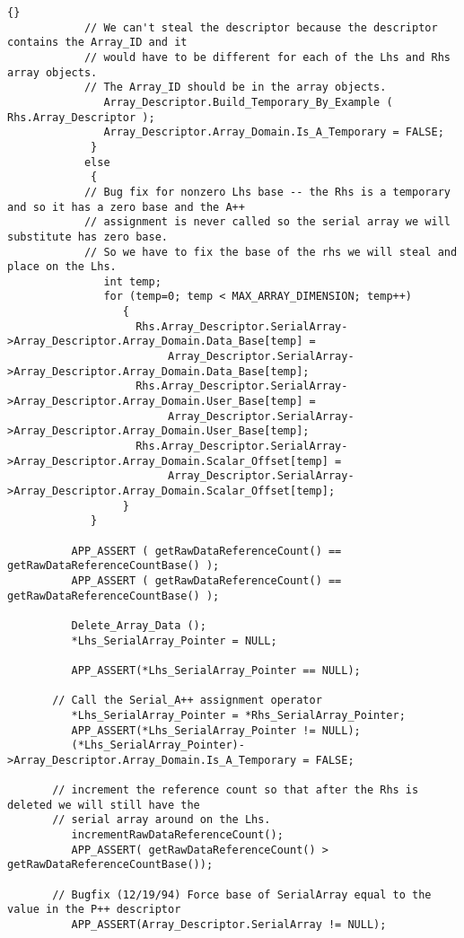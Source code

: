 \documentclass[10pt]{llncs}
\begin{document}
\begin{lstlisting}{}
            // We can't steal the descriptor because the descriptor contains the Array_ID and it
            // would have to be different for each of the Lhs and Rhs array objects.
            // The Array_ID should be in the array objects.
               Array_Descriptor.Build_Temporary_By_Example ( Rhs.Array_Descriptor ); 
               Array_Descriptor.Array_Domain.Is_A_Temporary = FALSE;
             }
            else
             {
            // Bug fix for nonzero Lhs base -- the Rhs is a temporary and so it has a zero base and the A++
            // assignment is never called so the serial array we will substitute has zero base.  
            // So we have to fix the base of the rhs we will steal and place on the Lhs.
               int temp;
               for (temp=0; temp < MAX_ARRAY_DIMENSION; temp++)
                  {
                    Rhs.Array_Descriptor.SerialArray->Array_Descriptor.Array_Domain.Data_Base[temp] = 
                         Array_Descriptor.SerialArray->Array_Descriptor.Array_Domain.Data_Base[temp];
                    Rhs.Array_Descriptor.SerialArray->Array_Descriptor.Array_Domain.User_Base[temp] = 
                         Array_Descriptor.SerialArray->Array_Descriptor.Array_Domain.User_Base[temp];
                    Rhs.Array_Descriptor.SerialArray->Array_Descriptor.Array_Domain.Scalar_Offset[temp] = 
                         Array_Descriptor.SerialArray->Array_Descriptor.Array_Domain.Scalar_Offset[temp];
                  }
             }

          APP_ASSERT ( getRawDataReferenceCount() == getRawDataReferenceCountBase() );
          APP_ASSERT ( getRawDataReferenceCount() == getRawDataReferenceCountBase() );

          Delete_Array_Data ();
          *Lhs_SerialArray_Pointer = NULL;

          APP_ASSERT(*Lhs_SerialArray_Pointer == NULL);

       // Call the Serial_A++ assignment operator
          *Lhs_SerialArray_Pointer = *Rhs_SerialArray_Pointer;
          APP_ASSERT(*Lhs_SerialArray_Pointer != NULL);
          (*Lhs_SerialArray_Pointer)->Array_Descriptor.Array_Domain.Is_A_Temporary = FALSE;

       // increment the reference count so that after the Rhs is deleted we will still have the
       // serial array around on the Lhs.
          incrementRawDataReferenceCount();
          APP_ASSERT( getRawDataReferenceCount() > getRawDataReferenceCountBase());

       // Bugfix (12/19/94) Force base of SerialArray equal to the value in the P++ descriptor
          APP_ASSERT(Array_Descriptor.SerialArray != NULL);


\end{lstlisting}
\end{document}
